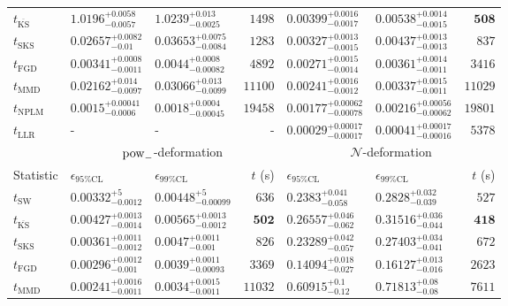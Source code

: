 \begin{tabular}{l|llr|llr}
	$t_{\overline{\mathrm{KS}}}$ & $1.0196_{-0.0057}^{+0.0058}$ & $1.0239_{-0.0025}^{+0.013}$ & $1498$ & $0.00399_{-0.0017}^{+0.0016}$ & $0.00538_{-0.0015}^{+0.0014}$ & ${\mathbf{508}}$ \\
	$t_{\mathrm{SKS}}$ & $0.02657_{-0.01}^{+0.0082}$ & $0.03653_{-0.0084}^{+0.0075}$ & $1283$ & $0.00327_{-0.0015}^{+0.0013}$ & $0.00437_{-0.0013}^{+0.0013}$ & $837$ \\
	$t_{\mathrm{FGD}}$ & ${\mathbf{0.00341_{-0.0011}^{+0.0008}}}$ & ${\mathbf{0.0044_{-0.00082}^{+0.0008}}}$ & $4892$ & $0.00271_{-0.0014}^{+0.0015}$ & $0.00361_{-0.0011}^{+0.0014}$ & $3416$ \\
	$t_{\mathrm{MMD}}$ & $0.02162_{-0.0097}^{+0.014}$ & $0.03066_{-0.0099}^{+0.013}$ & $11100$ & ${\mathbf{0.00241_{-0.0012}^{+0.0016}}}$ & ${\mathbf{0.00337_{-0.0011}^{+0.0015}}}$ & $11029$ \\
\rowcolor{red!35}	$t_{\mathrm{NPLM}}$ & $0.0015_{-0.0006}^{+0.00041}$ & $0.0018_{-0.00045}^{+0.0004}$ & $19458$ & $0.00177_{-0.00078}^{+0.00062}$ & $0.00216_{-0.00062}^{+0.00056}$ & $19801$ \\
	$t_{\mathrm{LLR}}$ & - & - & - & $0.00029_{-0.00017}^{+0.00017}$ & $0.00041_{-0.00016}^{+0.00017}$ & $5378$ \\
	\toprule
	\multicolumn{1}{c}{} & \multicolumn{3}{c}{$\rm{pow}_{-}$-deformation} & \multicolumn{3}{c}{$\mathcal{N}$-deformation} \\
	Statistic & $\epsilon_{95\%\mathrm{CL}}$ & $\epsilon_{99\%\mathrm{CL}}$ & $t$ (s) & $\epsilon_{95\%\mathrm{CL}}$ & $\epsilon_{99\%\mathrm{CL}}$ & $t$ (s) \\
	\midrule
	$t_{\mathrm{SW}}$ & $0.00332_{-0.0012}^{+5}$ & $0.00448_{-0.00099}^{+5}$ & $636$ & $0.2383_{-0.058}^{+0.041}$ & $0.2828_{-0.039}^{+0.032}$ & $527$ \\
	$t_{\overline{\mathrm{KS}}}$ & $0.00427_{-0.0014}^{+0.0013}$ & $0.00565_{-0.0012}^{+0.0013}$ & ${\mathbf{502}}$ & $0.26557_{-0.062}^{+0.046}$ & $0.31516_{-0.044}^{+0.036}$ & ${\mathbf{418}}$ \\
	$t_{\mathrm{SKS}}$ & $0.00361_{-0.0012}^{+0.0011}$ & $0.0047_{-0.001}^{+0.0011}$ & $826$ & $0.23289_{-0.057}^{+0.042}$ & $0.27403_{-0.041}^{+0.034}$ & $672$ \\
	$t_{\mathrm{FGD}}$ & $0.00296_{-0.001}^{+0.0012}$ & $0.0039_{-0.00093}^{+0.0011}$ & $3369$ & ${\mathbf{0.14094_{-0.027}^{+0.018}}}$ & ${\mathbf{0.16127_{-0.016}^{+0.013}}}$ & $2623$ \\
	$t_{\mathrm{MMD}}$ & ${\mathbf{0.00241_{-0.0011}^{+0.0016}}}$ & ${\mathbf{0.0034_{-0.0011}^{+0.0015}}}$ & $11032$ & $0.60915_{-0.12}^{+0.1}$ & $0.71813_{-0.08}^{+0.08}$ & $7611$ \\

\end{tabular}

